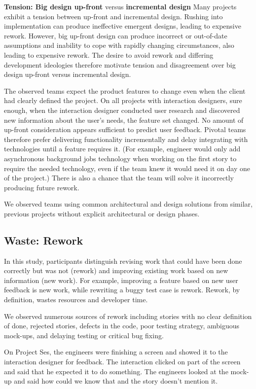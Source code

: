 \textbf{Tension:  Big design up-front} versus \textbf{incremental design}
Many projects exhibit a tension between up-front and incremental design. Rushing into implementation can produce ineffective emergent designs, leading to expensive rework. However, big up-front design can produce incorrect or out-of-date assumptions and inability to cope with rapidly changing circumstances, also leading to expensive rework. The desire to avoid rework and differing development ideologies therefore motivate tension and disagreement over big design up-front versus incremental design. 

The observed teams expect the product features to change even when the client had clearly defined the project. On all projects with interaction designers, sure enough, when the interaction designer conducted user research and discovered new information about the user's needs, the feature set changed. No amount of up-front consideration appears sufficient to predict user feedback. Pivotal teams therefore prefer delivering functionality incrementally and delay integrating with technologies until a feature requires it. (For example, engineer would only add asynchronous background jobs technology when working on the first story to require the needed technology, even if the team knew it would need it on day one of the project.) There is also a chance that the team will solve it incorrectly producing future rework.

We observed teams using common architectural and design solutions from similar, previous projects without explicit architectural or design phases.
\subsection{Waste: Rework}
In this study, participants distinguish revising work that could have been done correctly but was not (rework) and improving existing work based on new information (new work). For example, improving a feature based on new user feedback is new work, while rewriting a buggy test case is rework.  Rework, by definition, wastes resources and developer time. 

We observed numerous sources of rework including stories with no clear definition of done, rejected stories, defects in the code, poor testing strategy, ambiguous mock-ups, and delaying testing or critical bug fixing.

On Project Ses, the engineers were finishing a screen and showed it to the interaction designer for feedback. The interaction clicked on part of the screen and said that he expected it to do something. The engineers looked at the mock-up and said how could we know that and the story doesn't mention it. 

